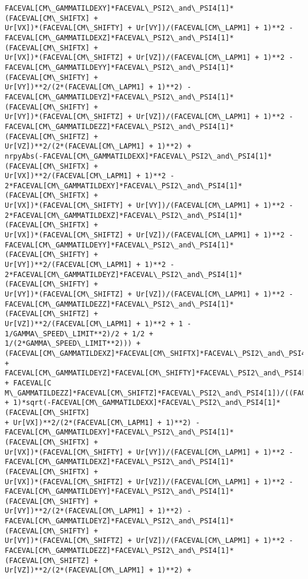 \documentclass[landscape,letterpaper,10pt,english]{article}
\begin{document}
\begin{Verbatim}[commandchars=\\\{\}]
FACEVAL[CM\_GAMMATILDEXY]*FACEVAL\_PSI2\_and\_PSI4[1]*(FACEVAL[CM\_SHIFTX] +
Ur[VX])*(FACEVAL[CM\_SHIFTY] + Ur[VY])/(FACEVAL[CM\_LAPM1] + 1)**2 -
FACEVAL[CM\_GAMMATILDEXZ]*FACEVAL\_PSI2\_and\_PSI4[1]*(FACEVAL[CM\_SHIFTX] +
Ur[VX])*(FACEVAL[CM\_SHIFTZ] + Ur[VZ])/(FACEVAL[CM\_LAPM1] + 1)**2 -
FACEVAL[CM\_GAMMATILDEYY]*FACEVAL\_PSI2\_and\_PSI4[1]*(FACEVAL[CM\_SHIFTY] +
Ur[VY])**2/(2*(FACEVAL[CM\_LAPM1] + 1)**2) -
FACEVAL[CM\_GAMMATILDEYZ]*FACEVAL\_PSI2\_and\_PSI4[1]*(FACEVAL[CM\_SHIFTY] +
Ur[VY])*(FACEVAL[CM\_SHIFTZ] + Ur[VZ])/(FACEVAL[CM\_LAPM1] + 1)**2 -
FACEVAL[CM\_GAMMATILDEZZ]*FACEVAL\_PSI2\_and\_PSI4[1]*(FACEVAL[CM\_SHIFTZ] +
Ur[VZ])**2/(2*(FACEVAL[CM\_LAPM1] + 1)**2) +
nrpyAbs(-FACEVAL[CM\_GAMMATILDEXX]*FACEVAL\_PSI2\_and\_PSI4[1]*(FACEVAL[CM\_SHIFTX] +
Ur[VX])**2/(FACEVAL[CM\_LAPM1] + 1)**2 -
2*FACEVAL[CM\_GAMMATILDEXY]*FACEVAL\_PSI2\_and\_PSI4[1]*(FACEVAL[CM\_SHIFTX] +
Ur[VX])*(FACEVAL[CM\_SHIFTY] + Ur[VY])/(FACEVAL[CM\_LAPM1] + 1)**2 -
2*FACEVAL[CM\_GAMMATILDEXZ]*FACEVAL\_PSI2\_and\_PSI4[1]*(FACEVAL[CM\_SHIFTX] +
Ur[VX])*(FACEVAL[CM\_SHIFTZ] + Ur[VZ])/(FACEVAL[CM\_LAPM1] + 1)**2 -
FACEVAL[CM\_GAMMATILDEYY]*FACEVAL\_PSI2\_and\_PSI4[1]*(FACEVAL[CM\_SHIFTY] +
Ur[VY])**2/(FACEVAL[CM\_LAPM1] + 1)**2 -
2*FACEVAL[CM\_GAMMATILDEYZ]*FACEVAL\_PSI2\_and\_PSI4[1]*(FACEVAL[CM\_SHIFTY] +
Ur[VY])*(FACEVAL[CM\_SHIFTZ] + Ur[VZ])/(FACEVAL[CM\_LAPM1] + 1)**2 -
FACEVAL[CM\_GAMMATILDEZZ]*FACEVAL\_PSI2\_and\_PSI4[1]*(FACEVAL[CM\_SHIFTZ] +
Ur[VZ])**2/(FACEVAL[CM\_LAPM1] + 1)**2 + 1 - 1/GAMMA\_SPEED\_LIMIT**2)/2 + 1/2 +
1/(2*GAMMA\_SPEED\_LIMIT**2))) +
(FACEVAL[CM\_GAMMATILDEXZ]*FACEVAL[CM\_SHIFTX]*FACEVAL\_PSI2\_and\_PSI4[1] +
FACEVAL[CM\_GAMMATILDEYZ]*FACEVAL[CM\_SHIFTY]*FACEVAL\_PSI2\_and\_PSI4[1] + FACEVAL[C
M\_GAMMATILDEZZ]*FACEVAL[CM\_SHIFTZ]*FACEVAL\_PSI2\_and\_PSI4[1])/((FACEVAL[CM\_LAPM1]
+ 1)*sqrt(-FACEVAL[CM\_GAMMATILDEXX]*FACEVAL\_PSI2\_and\_PSI4[1]*(FACEVAL[CM\_SHIFTX]
+ Ur[VX])**2/(2*(FACEVAL[CM\_LAPM1] + 1)**2) -
FACEVAL[CM\_GAMMATILDEXY]*FACEVAL\_PSI2\_and\_PSI4[1]*(FACEVAL[CM\_SHIFTX] +
Ur[VX])*(FACEVAL[CM\_SHIFTY] + Ur[VY])/(FACEVAL[CM\_LAPM1] + 1)**2 -
FACEVAL[CM\_GAMMATILDEXZ]*FACEVAL\_PSI2\_and\_PSI4[1]*(FACEVAL[CM\_SHIFTX] +
Ur[VX])*(FACEVAL[CM\_SHIFTZ] + Ur[VZ])/(FACEVAL[CM\_LAPM1] + 1)**2 -
FACEVAL[CM\_GAMMATILDEYY]*FACEVAL\_PSI2\_and\_PSI4[1]*(FACEVAL[CM\_SHIFTY] +
Ur[VY])**2/(2*(FACEVAL[CM\_LAPM1] + 1)**2) -
FACEVAL[CM\_GAMMATILDEYZ]*FACEVAL\_PSI2\_and\_PSI4[1]*(FACEVAL[CM\_SHIFTY] +
Ur[VY])*(FACEVAL[CM\_SHIFTZ] + Ur[VZ])/(FACEVAL[CM\_LAPM1] + 1)**2 -
FACEVAL[CM\_GAMMATILDEZZ]*FACEVAL\_PSI2\_and\_PSI4[1]*(FACEVAL[CM\_SHIFTZ] +
Ur[VZ])**2/(2*(FACEVAL[CM\_LAPM1] + 1)**2) +

\end{Verbatim}
\end{document}
